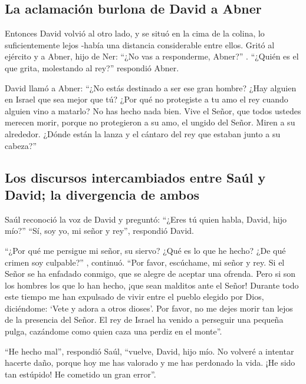 \hypertarget{la-aclamaciuxf3n-burlona-de-david-a-abner}{%
\subsection{La aclamación burlona de David a
Abner}\label{la-aclamaciuxf3n-burlona-de-david-a-abner}}

 Entonces David volvió al otro lado, y se situó en la
cima de la colina, lo suficientemente lejos -había una distancia
considerable entre ellos.  Gritó al ejército y a Abner,
hijo de Ner: ``¿No vas a responderme, Abner?'' . ``¿Quién es el que
grita, molestando al rey?'' respondió Abner.

 David llamó a Abner: ``¿No estás destinado a ser ese
gran hombre? ¿Hay alguien en Israel que sea mejor que tú? ¿Por qué no
protegiste a tu amo el rey cuando alguien vino a matarlo?
 No has hecho nada bien. Vive el Señor, que todos ustedes
merecen morir, porque no protegieron a su amo, el ungido del Señor.
Miren a su alrededor. ¿Dónde están la lanza y el cántaro del rey que
estaban junto a su cabeza?''

\hypertarget{los-discursos-intercambiados-entre-sauxfal-y-david-la-divergencia-de-ambos}{%
\subsection{Los discursos intercambiados entre Saúl y David; la
divergencia de
ambos}\label{los-discursos-intercambiados-entre-sauxfal-y-david-la-divergencia-de-ambos}}

 Saúl reconoció la voz de David y preguntó: ``¿Eres tú
quien habla, David, hijo mío?'' ``Sí, soy yo, mi señor y rey'',
respondió David.

 ``¿Por qué me persigue mi señor, su siervo? ¿Qué es lo
que he hecho? ¿De qué crimen soy culpable?'' , continuó. 
``Por favor, escúchame, mi señor y rey. Si el Señor se ha enfadado
conmigo, que se alegre de aceptar una ofrenda. Pero si son los hombres
los que lo han hecho, ¡que sean malditos ante el Señor! Durante todo
este tiempo me han expulsado de vivir entre el pueblo elegido por Dios,
diciéndome: `Vete y adora a otros dioses'.  Por favor, no
me dejes morir tan lejos de la presencia del Señor. El rey de Israel ha
venido a perseguir una pequeña pulga, cazándome como quien caza una
perdiz en el monte''.

 ``He hecho mal'', respondió Saúl, ``vuelve, David, hijo
mío. No volveré a intentar hacerte daño, porque hoy me has valorado y me
has perdonado la vida. ¡He sido tan estúpido! He cometido un gran
error''.

